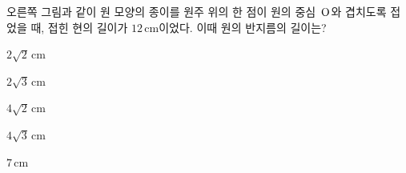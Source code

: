 \noindent\begin{minipage}[t]{0.58\linewidth}\vspace{0pt}\raggedright 오른쪽 그림과 같이 원 모양의 종이를 원주 위의 한 점이 원의 중심~$\mathrm{O}$와 겹치도록 접었을 때, 접힌 현의 길이가 $12\,\mathrm{cm}$이었다. 이때 원의 반지름의 길이는?\end{minipage}\hfill\begin{minipage}[t]{0.4\linewidth}\vspace{0pt}\centering \resizebox{\ifdim\width>\linewidth\linewidth\else\width\fi}{!}{}\end{minipage}\par
\begin{choices32}{\rule[-3ex]{0pt}{8ex}$2\sqrt{2}\,\mathrm{cm}$}{\rule[-3ex]{0pt}{8ex}$2\sqrt{3}\,\mathrm{cm}$}{\rule[-3ex]{0pt}{8ex}$4\sqrt{2}\,\mathrm{cm}$}{\rule[-3ex]{0pt}{8ex}$4\sqrt{3}\,\mathrm{cm}$}{\rule[-3ex]{0pt}{8ex}$7\,\mathrm{cm}$}\end{choices32}
